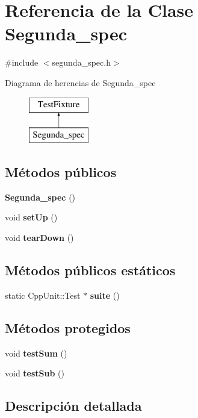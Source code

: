 \section{Referencia de la Clase Segunda\+\_\+spec}
\label{class_segunda__spec}


{\ttfamily \#include $<$segunda\+\_\+spec.\+h$>$}

Diagrama de herencias de Segunda\+\_\+spec\begin{figure}[H]
\begin{center}
\leavevmode
\includegraphics[height=2.000000cm]{class_segunda__spec}
\end{center}
\end{figure}
\subsection*{Métodos públicos}
\begin{DoxyCompactItemize}
\item 
{\bf Segunda\+\_\+spec} ()
\item 
void {\bf set\+Up} ()
\item 
void {\bf tear\+Down} ()
\end{DoxyCompactItemize}
\subsection*{Métodos públicos estáticos}
\begin{DoxyCompactItemize}
\item 
static Cpp\+Unit\+::\+Test $\ast$ {\bf suite} ()
\end{DoxyCompactItemize}
\subsection*{Métodos protegidos}
\begin{DoxyCompactItemize}
\item 
void {\bf test\+Sum} ()
\item 
void {\bf test\+Sub} ()
\end{DoxyCompactItemize}


\subsection{Descripción detallada}


